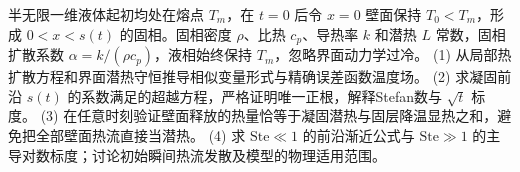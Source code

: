半无限一维液体起初均处在熔点 \(T_m\)，在 \(t=0\) 后令 \(x=0\) 壁面保持 \(T_0<T_m\)，形成 \(0<x<s(t)\) 的固相。固相密度 \(\rho\)、比热 \(c_p\)、导热率 \(k\) 和潜热 \(L\) 常数，固相扩散系数 \(\alpha=k/(\rho c_p)\)，液相始终保持 \(T_m\)，忽略界面动力学过冷。
(1) 从局部热扩散方程和界面潜热守恒推导相似变量形式与精确误差函数温度场。
(2) 求凝固前沿 \(s(t)\) 的系数满足的超越方程，严格证明唯一正根，解释Stefan数与 \(\sqrt t\) 标度。
(3) 在任意时刻验证壁面释放的热量恰等于凝固潜热与固层降温显热之和，避免把全部壁面热流直接当潜热。
(4) 求 \(\mathrm{Ste}\ll1\) 的前沿渐近公式与 \(\mathrm{Ste}\gg1\) 的主导对数标度；讨论初始瞬间热流发散及模型的物理适用范围。
